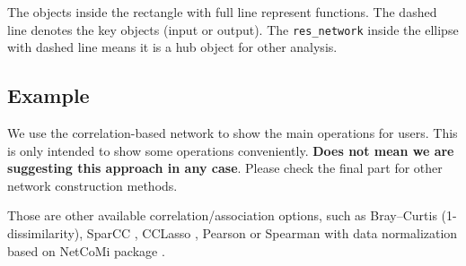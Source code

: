 \documentclass[
]{book}
\newenvironment{Shaded}{\begin{snugshade}}{\end{snugshade}}
\newcommand{\AttributeTok}[1]{\textcolor[rgb]{0.77,0.63,0.00}{#1}}
\newcommand{\CommentTok}[1]{\textcolor[rgb]{0.56,0.35,0.01}{\textit{#1}}}
\newcommand{\FloatTok}[1]{\textcolor[rgb]{0.00,0.00,0.81}{#1}}
\newcommand{\FunctionTok}[1]{\textcolor[rgb]{0.00,0.00,0.00}{#1}}
\newcommand{\NormalTok}[1]{#1}
\newcommand{\OtherTok}[1]{\textcolor[rgb]{0.56,0.35,0.01}{#1}}
\newcommand{\SpecialCharTok}[1]{\textcolor[rgb]{0.00,0.00,0.00}{#1}}
\newcommand{\StringTok}[1]{\textcolor[rgb]{0.31,0.60,0.02}{#1}}
\begin{document}
The objects inside the rectangle with full line represent functions.
The dashed line denotes the key objects (input or output). The \texttt{res\_network} inside the ellipse with dashed line means it is a hub object for other analysis.

\hypertarget{example-5}{%
\subsection{Example}\label{example-5}}

We use the correlation-based network to show the main operations for users.
This is only intended to show some operations conveniently.
\textbf{Does not mean we are suggesting this approach in any case}.
Please check the final part for other network construction methods.

\begin{Shaded}
\end{Shaded}

Those are other available correlation/association options,
such as Bray--Curtis (1-dissimilarity), SparCC \citep{Friedman_Inferring_2012}, CCLasso \citep{Fang_CCLasso_2015},
Pearson or Spearman with data normalization based on NetCoMi package \citep{Peschel_NetCoMi_2021}.
\end{document}
